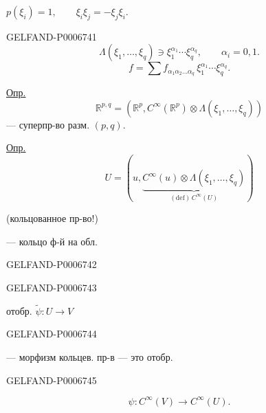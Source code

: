 \(p(\xi_i)=1,\qquad \xi_i\xi_j=-\xi_j\xi_i.\)


\begin{GelfandAdjacentEvidence}{GELFAND-P000674}{1}
\[
\Lambda(\xi_1,\ldots,\xi_q)\ni\xi_1^{\alpha_1}\cdots\xi_q^{\alpha_q},
\qquad \alpha_i=0,1.
\]
\[
f=\sum f_{\alpha_1\alpha_2\ldots\alpha_q}\,
     \xi_1^{\alpha_1}\cdots\xi_q^{\alpha_q}.
\]

\underline{Опр.}
\[
\mathbb R^{p,q}=
\left(\mathbb R^p,C^\infty(\mathbb R^p)\otimes\Lambda(\xi_1,\ldots,\xi_q)\right)
\]
--- суперпр-во разм. \((p,q)\).

\underline{Опр.}
\[
U=\left(u,\underbrace{C^\infty(u)\otimes\Lambda(\xi_1,\ldots,\xi_q)}
                        _{(\mathrm{def})\, C^\infty(U)}\right)
\]

(кольцованное пр-во!)

--- кольцо ф-й на обл.
\end{GelfandAdjacentEvidence}
\begin{GelfandAdjacentEvidence}{GELFAND-P000674}{2}

\end{GelfandAdjacentEvidence}
\begin{GelfandAdjacentEvidence}{GELFAND-P000674}{3}


отобр. \(\widetilde{\psi}:U\to V\)
\end{GelfandAdjacentEvidence}
\begin{GelfandAdjacentEvidence}{GELFAND-P000674}{4}

--- морфизм кольцев. пр-в ---
это отобр.
\end{GelfandAdjacentEvidence}
\begin{GelfandAdjacentEvidence}{GELFAND-P000674}{5}

\[
\psi:C^\infty(V)\to C^\infty(U).
\]
\end{GelfandAdjacentEvidence}

